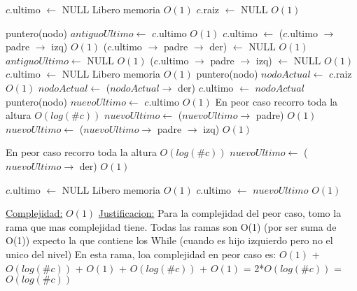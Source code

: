 \begin{Algoritmos}
\begin{algorithm}[H]
\begin{algorithmic}[1]
        \State $c$.ultimo $\gets$ NULL \Comment Libero memoria $O(1)$
        \State $c$.raiz $\gets$ NULL \Comment $O(1)$
    \Else

        \State puntero(nodo) $antiguoUltimo \gets$ $c$.ultimo \Comment $O(1)$
        \State $c$.ultimo $\gets$ ($c$.ultimo $\to$ padre $\to$ izq) \Comment $O(1)$
        \State ($c$.ultimo $\to$ padre $\to$ der) $\gets$ NULL \Comment $O(1)$
        \State $antiguoUltimo \gets$ NULL \Comment $O(1)$
    \Else
            \State ($c$.ultimo $\to$ padre $\to$ izq) $\gets$ NULL \Comment $O(1)$
            \State $c$.ultimo $\gets$ NULL \Comment Libero memoria $O(1)$
            \State puntero(nodo) $nodoActual \gets$ $c$.raiz \Comment $O(1)$
                $nodoActual \gets$ ($nodoActual \to$ der)
            \EndWhile
            \State $c$.ultimo $\gets$ $nodoActual$
        \Else
            \State puntero(nodo) $nuevoUltimo \gets$ $c$.ultimo \Comment $O(1)$
              \Comment En peor caso recorro toda la altura $O(log(\#c))$
                \State $nuevoUltimo \gets$ ($nuevoUltimo \to$ padre) \Comment $O(1)$  
            \EndWhile
            \State $nuevoUltimo \gets$ ($nuevoUltimo \to$ padre $\to$ izq)  \Comment $O(1)$

              \Comment En peor caso recorro toda la altura  $O(log(\#c))$
                \State $nuevoUltimo \gets$ ($nuevoUltimo \to$ der) \Comment $O(1)$  
            \EndWhile

            \State $c$.ultimo $\gets$ NULL \Comment Libero memoria $O(1)$
            \State $c$.ultimo $\gets$ $nuevoUltimo$ \Comment $O(1)$

        \EndIf


    \EndIf

    \EndIf

    \medskip
    \Statex \underline{Complejidad:} $O(1)$
    \Statex \underline{Justificacion:} Para la complejidad del peor caso, tomo la rama que mas complejidad tiene. Todas las ramas son O(1) (por ser suma de O(1)) expecto la que contiene los While (cuando es hijo izquierdo pero no el unico del nivel) En esta rama, loa complejidad en peor caso es: $O(1)$ + $O(log(\#c))$ + $O(1)$ + $O(log(\#c))$ + $O(1)$ = 2*$O(log(\#c))$ = $O(log(\#c))$


\end{algorithmic}
\end{algorithm}
\end{Algoritmos}
